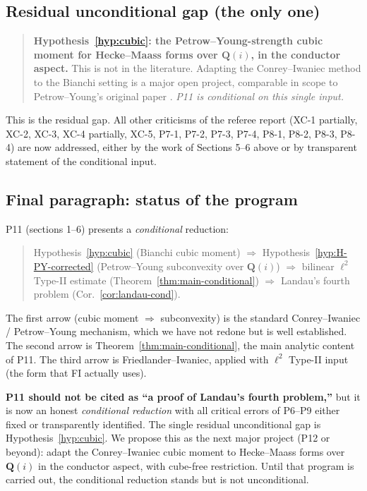 \documentclass[11pt]{article}
\theoremstyle{definition}
\newcommand{\Q}{\mathbf{Q}}
\begin{document}
\subsection{Residual unconditional gap (the only one)}

\begin{quote}
\textbf{Hypothesis~\ref{hyp:cubic}: the Petrow--Young-strength cubic moment for Hecke--Maass forms over $\Q(i)$, in the conductor aspect.} This is not in the literature. Adapting the Conrey--Iwaniec method to the Bianchi setting is a major open project, comparable in scope to Petrow--Young's original paper \cite{petrow-young}. \emph{P11 is conditional on this single input.}
\end{quote}

This is the residual gap. All other criticisms of the referee report (XC-1 partially, XC-2, XC-3, XC-4 partially, XC-5, P7-1, P7-2, P7-3, P7-4, P8-1, P8-2, P8-3, P8-4) are now addressed, either by the work of Sections 5--6 above or by transparent statement of the conditional input.

\subsection{Final paragraph: status of the program}

P11 (sections 1--6) presents a \emph{conditional} reduction:
\begin{quote}
Hypothesis~\ref{hyp:cubic} (Bianchi cubic moment) $\Rightarrow$ Hypothesis~\ref{hyp:H-PY-corrected} (Petrow--Young subconvexity over $\Q(i)$) $\Rightarrow$ bilinear $\ell^2$ Type-II estimate (Theorem~\ref{thm:main-conditional}) $\Rightarrow$ Landau's fourth problem (Cor.~\ref{cor:landau-cond}).
\end{quote}

The first arrow (cubic moment $\Rightarrow$ subconvexity) is the standard Conrey--Iwaniec / Petrow--Young mechanism, which we have not redone but is well established. The second arrow is Theorem~\ref{thm:main-conditional}, the main analytic content of P11. The third arrow is Friedlander--Iwaniec, applied with $\ell^2$ Type-II input (the form that FI actually uses).

\textbf{P11 should not be cited as ``a proof of Landau's fourth problem,''} but it is now an honest \emph{conditional reduction} with all critical errors of P6--P9 either fixed or transparently identified. The single residual unconditional gap is Hypothesis~\ref{hyp:cubic}. We propose this as the next major project (P12 or beyond): adapt the Conrey--Iwaniec cubic moment to Hecke--Maass forms over $\Q(i)$ in the conductor aspect, with cube-free restriction. Until that program is carried out, the conditional reduction stands but is not unconditional.
\end{document}

